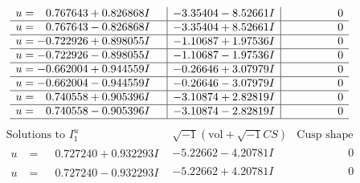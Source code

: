 \documentclass[1p]{elsarticle_modified}
\theoremstyle{definition}
\newcommand{\I}{\sqrt{-1}}
\begin{document}
$$\begin{array}{c|c|c}
\begin{aligned}
u &= \phantom{-}0.767643 + 0.826868 I\end{aligned}
 & -3.35404 - 8.52661 I & \phantom{-0.000000 } 0 \\ \hline\begin{aligned}
u &= \phantom{-}0.767643 - 0.826868 I\end{aligned}
 & -3.35404 + 8.52661 I & \phantom{-0.000000 } 0 \\ \hline\begin{aligned}
u &= -0.722926 + 0.898055 I\end{aligned}
 & -1.10687 + 1.97536 I & \phantom{-0.000000 } 0 \\ \hline\begin{aligned}
u &= -0.722926 - 0.898055 I\end{aligned}
 & -1.10687 - 1.97536 I & \phantom{-0.000000 } 0 \\ \hline\begin{aligned}
u &= -0.662004 + 0.944559 I\end{aligned}
 & -0.26646 + 3.07979 I & \phantom{-0.000000 } 0 \\ \hline\begin{aligned}
u &= -0.662004 - 0.944559 I\end{aligned}
 & -0.26646 - 3.07979 I & \phantom{-0.000000 } 0 \\ \hline\begin{aligned}
u &= \phantom{-}0.740558 + 0.905396 I\end{aligned}
 & -3.10874 + 2.82819 I & \phantom{-0.000000 } 0 \\ \hline\begin{aligned}
u &= \phantom{-}0.740558 - 0.905396 I\end{aligned}
 & -3.10874 - 2.82819 I & \phantom{-0.000000 } 0\\
 \hline 
 \end{array}$$\newpage$$\begin{array}{c|c|c}  
\text{Solutions to }I^u_{1}& \I (\text{vol} + \sqrt{-1}CS) & \text{Cusp shape}\\
 \hline 
\begin{aligned}
u &= \phantom{-}0.727240 + 0.932293 I\end{aligned}
 & -5.22662 - 4.20781 I & \phantom{-0.000000 } 0 \\ \hline\begin{aligned}
u &= \phantom{-}0.727240 - 0.932293 I\end{aligned}
 & -5.22662 + 4.20781 I & \phantom{-0.000000 } 0 \\ \hline\begin{aligned}

\end{aligned}
\end{array}$$
\end{document}
